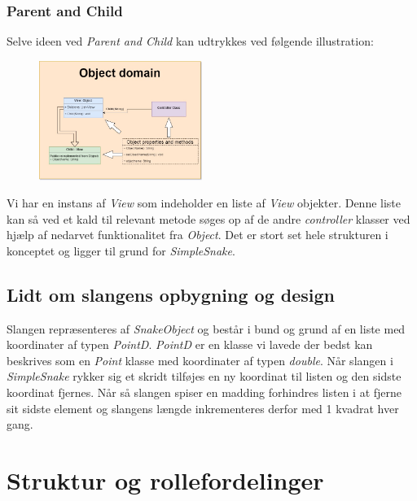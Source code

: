 \documentclass[]{article}
\begin{document}
\subsubsection{Parent and Child}
\pagebreak
Selve ideen ved \textit{Parent and Child} kan udtrykkes ved følgende illustration:

\begin{figure}[h!]
	\centering
	\includegraphics[width=200px]{Object_hierarchy.jpg}
	\label{fig:hierarchy}
\end{figure}

Vi har en instans af \textit{View} som indeholder en liste af \textit{View} objekter. Denne liste kan så ved et kald til relevant metode søges op af de andre \textit{controller} klasser ved hjælp af nedarvet funktionalitet fra \textit{Object}. Det er stort set hele strukturen i konceptet og ligger til grund for \textit{SimpleSnake}.


\subsection{Lidt om slangens opbygning og design}

Slangen repræsenteres af \textit{SnakeObject} og består i bund og grund af en liste med koordinater af typen \textit{PointD}. \textit{PointD} er en klasse vi lavede der bedst kan beskrives som en \textit{Point} klasse med koordinater af typen \textit{double}. Når slangen i \textit{SimpleSnake} rykker sig et skridt tilføjes en ny koordinat til listen og den sidste koordinat fjernes. Når så slangen spiser en madding forhindres listen i at fjerne sit sidste element og slangens længde inkrementeres derfor med 1 kvadrat hver gang.


\section{Struktur og rollefordelinger}
\end{document}
